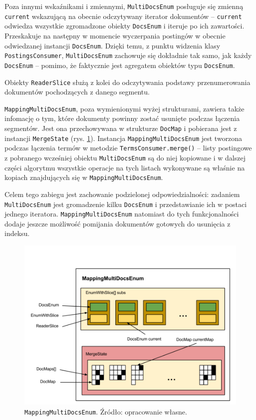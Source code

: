 Poza innymi wskaźnikami i zmiennymi, \texttt{MultiDocsEnum} posługuje się zmienną \texttt{current} wskazującą na obecnie odczytywany iterator dokumentów -- \texttt{current} odwiedza wszystkie zgromadzone obiekty \texttt{DocsEnum} i iteruje po ich zawartości. Przeskakuje na następny w momencie wyczerpania postingów w obecnie odwiedzanej instancji \texttt{DocsEnum}. Dzięki temu, z punktu widzenia klasy \texttt{PostingsConsumer}, \texttt{MultiDocsEnum} zachowuje się dokładnie tak samo, jak każdy \texttt{DocsEnum} -- pomimo, że faktycznie jest agregatem obiektów typu \texttt{DocsEnum}. 

Obiekty \texttt{ReaderSlice} służą z kolei do odczytywania podstawy przenumerowania dokumentów pochodzących z danego segmentu.

\texttt{MappingMultiDocsEnum}, poza wymienionymi wyżej strukturami, zawiera także infomację o tym, które dokumenty powinny zostać usunięte podczas łączenia segmentów. Jest ona przechowywana w strukturze \texttt{DocMap} i pobierana jest z instancji \texttt{MergeState} (rys. \ref{fig:mappingMultiDocsEnum}). Instancja \texttt{MappingMultiDocsEnum} jest tworzona podczas łączenia termów w metodzie \texttt{TermsConsumer.merge()} -- listy postingowe z pobranego wcześniej obiektu \texttt{MultiDocsEnum} są do niej kopiowane i w dalszej części algorytmu wszystkie operacje na tych listach wykonywane są właśnie na kopiach znajdujących się w \texttt{MappingMultiDocsEnum}. 

Celem tego zabiegu jest zachowanie podzielonej odpowiedzialności: zadaniem \texttt{MultiDocsEnum} jest gromadzenie kilku \texttt{DocsEnum} i przedstawianie ich w postaci jednego iteratora. \texttt{MappingMultiDocsEnum} natomiast do tych funkcjonalności dodaje jeszcze możliwość pomijania dokumentów gotowych do usunięcia z indeksu. 

\begin{figure}[here]
 \includegraphics[scale=0.4]{pictures/MappingMultiDocsEnum.png}
 \caption{\texttt{MappingMultiDocsEnum}. Źródło: opracowanie własne. \label{fig:mappingMultiDocsEnum}}
\end{figure}

